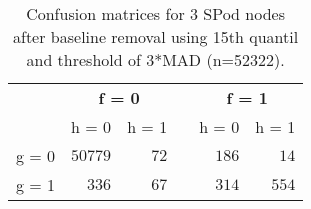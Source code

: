 \begin{table}[!tbp]
\caption{Confusion matrices for 3 SPod nodes after baseline 
      removal using 15th quantil and threshold of 3*MAD (n=52322).\label{conf}} 
\begin{center}
\begin{tabular}{lrrcrr}
\hline\hline
\multicolumn{1}{l}{\bfseries }&\multicolumn{2}{c}{\bfseries f = 0}&\multicolumn{1}{c}{\bfseries }&\multicolumn{2}{c}{\bfseries f = 1}\tabularnewline
\cline{2-3} \cline{5-6}
\multicolumn{1}{l}{}&\multicolumn{1}{c}{h = 0}&\multicolumn{1}{c}{h = 1}&\multicolumn{1}{c}{}&\multicolumn{1}{c}{h = 0}&\multicolumn{1}{c}{h = 1}\tabularnewline
\hline
g = 0&$50779$&$72$&&$186$&$ 14$\tabularnewline
g = 1&$  336$&$67$&&$314$&$554$\tabularnewline
\hline
\end{tabular}\end{center}
\end{table}
